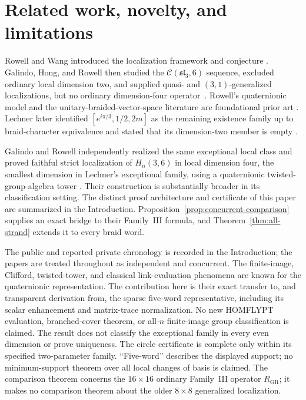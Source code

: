 \documentclass[11pt]{article}
\theoremstyle{remark}
\newcommand{\cC}{\mathcal C}
\begin{document}
\section{Related work, novelty, and limitations}\label{sec:priority}

Rowell and Wang introduced the localization framework and conjecture
\cite{RowellWang2012}.  Galindo, Hong, and Rowell then studied the
\(\cC(\mathfrak{sl}_3,6)\) sequence, excluded ordinary local dimension two,
and supplied quasi- and \((3,1)\)-generalized localizations, but no ordinary
dimension-four operator~\cite[\S5.6]{GHR2013}.  Rowell's quaternionic model
and the unitary-braided-vector-space literature are foundational prior art
\cite{Rowell2011,GalindoRowell2014}.  Lechner later identified
\([e^{i\pi/3},1/2,2m]\) as the remaining existence family up to
braid-character equivalence and stated that its dimension-two member is empty
\cite[p.~16, discussion following Proposition~3.6]{Lechner2026}.

Galindo and Rowell independently realized the same exceptional local class and
proved faithful strict localization of \(H_n(3,6)\) in local dimension four,
the smallest dimension in Lechner's exceptional family, using a quaternionic
twisted-group-algebra tower
\cite[\S13]{GalindoRowell2026}.  Their construction is substantially broader
in its classification setting.  The distinct proof architecture and
certificate of this paper are summarized in the Introduction.
Proposition~\ref{prop:concurrent-comparison}
supplies an exact bridge to their Family~III formula, and
Theorem~\ref{thm:all-strand} extends it to every braid word.

The public and reported private chronology is recorded in
the Introduction; the papers are treated throughout as independent and
concurrent.  The finite-image, Clifford, twisted-tower, and classical
link-evaluation phenomena are known for the quaternionic representation.  The
contribution here is their exact transfer to, and transparent derivation from,
the sparse five-word representative, including its scalar enhancement and
matrix-trace normalization.  No new HOMFLYPT evaluation, branched-cover
theorem, or all-\(n\) finite-image group classification is claimed.  The result
does not classify the exceptional family in every even dimension or prove
uniqueness.  The circle certificate is complete only within its specified
two-parameter family.  ``Five-word'' describes the displayed support; no
minimum-support theorem over all local changes of basis is claimed.
The comparison theorem concerns the \(16\times16\) ordinary
Family~III operator \(R_{\mathrm{GR}}\); it makes no comparison theorem about
the older \(8\times8\) generalized localization.
\end{document}
